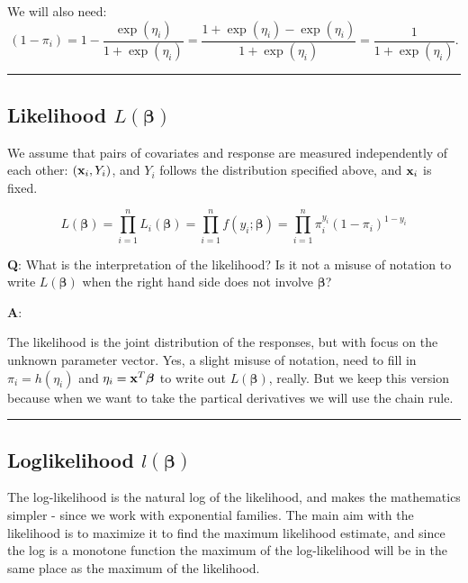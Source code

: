 \documentclass[
]{article}
\begin{document}
We will also need:
\[(1-\pi_i)=1-\frac{\exp(\eta_i)}{1+\exp(\eta_i)}=\frac{1+\exp(\eta_i)-\exp(\eta_i)}{1+\exp(\eta_i)}=\frac{1}{1+\exp(\eta_i)}.\]

\begin{center}\rule{0.5\linewidth}{0.5pt}\end{center}

\hypertarget{likelihood-lboldsymbolbeta}{%
\subsection{\texorpdfstring{Likelihood
\(L(\boldsymbol{\beta})\)}{Likelihood L(\textbackslash boldsymbol\{\textbackslash beta\})}}\label{likelihood-lboldsymbolbeta}}

We assume that pairs of covariates and response are measured
independently of each other: \(({\bf x}_i,Y_i)\), and \(Y_i\) follows
the distribution specified above, and \({\bf x}_i\) is fixed.

\[L(\boldsymbol{\beta})=\prod_{i=1}^n L_i(\boldsymbol{\beta})=\prod_{i=1}^n f(y_i; \boldsymbol{\beta})=\prod_{i=1}^n\pi_i^{y_i}(1-\pi_i)^{1-y_i}\]

\textbf{Q}: What is the interpretation of the likelihood? Is it not a
misuse of notation to write \(L(\boldsymbol{\beta})\) when the right
hand side does not involve \(\boldsymbol{\beta}\)?

\textbf{A}:

The likelihood is the joint distribution of the responses, but with
focus on the unknown parameter vector. Yes, a slight misuse of notation,
need to fill in \(\pi_i=h(\eta_i)\) and
\(\eta_i={\bf x}^T\boldsymbol{\beta}\) to write out
\(L(\boldsymbol{\beta})\), really. But we keep this version because when
we want to take the partical derivatives we will use the chain rule.

\begin{center}\rule{0.5\linewidth}{0.5pt}\end{center}

\hypertarget{loglikelihood-lboldsymbolbeta}{%
\subsection{\texorpdfstring{Loglikelihood
\(l(\boldsymbol{\beta})\)}{Loglikelihood l(\textbackslash boldsymbol\{\textbackslash beta\})}}\label{loglikelihood-lboldsymbolbeta}}

The log-likelihood is the natural log of the likelihood, and makes the
mathematics simpler - since we work with exponential families. The main
aim with the likelihood is to maximize it to find the maximum likelihood
estimate, and since the log is a monotone function the maximum of the
log-likelihood will be in the same place as the maximum of the
likelihood.
\end{document}
